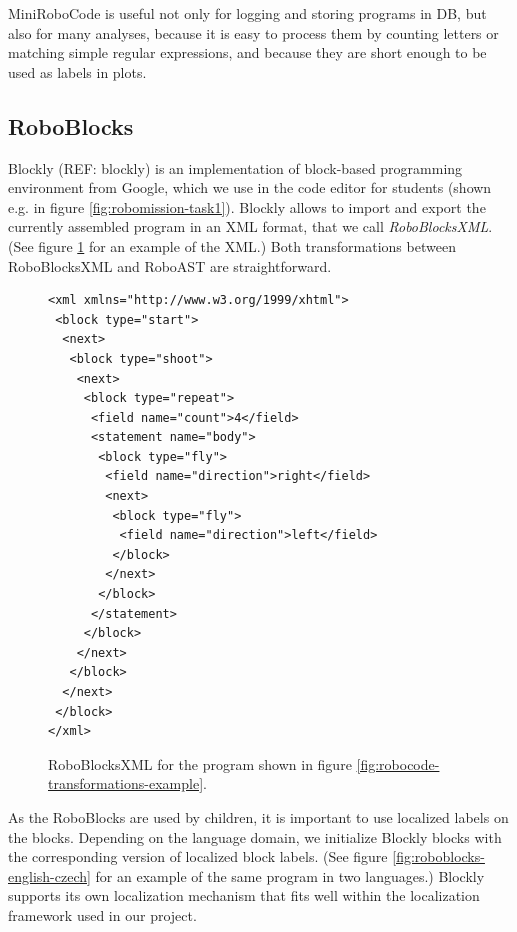 MiniRoboCode is useful not only for logging and storing programs in DB,
but also for many analyses,
because it is easy to process them by counting letters or matching simple regular expressions,
and because they are short enough to be used as labels in plots.


\subsection{RoboBlocks}

Blockly (REF: blockly) is an implementation of block-based programming
environment from Google,
which we use in the code editor for students
(shown e.g. in figure \ref{fig:robomission-task1}).
Blockly allows to import and export the currently assembled program in
an XML format, that we call \emph{RoboBlocksXML}.
(See figure \ref{fig:roboblocks-xml} for an example of the XML.)
Both transformations between RoboBlocksXML and RoboAST are straightforward.


\begin{figure}[h]
\begin{lstlisting}
<xml xmlns="http://www.w3.org/1999/xhtml">
 <block type="start">
  <next>
   <block type="shoot">
    <next>
     <block type="repeat">
      <field name="count">4</field>
      <statement name="body">
       <block type="fly">
        <field name="direction">right</field>
        <next>
         <block type="fly">
          <field name="direction">left</field>
         </block>
        </next>
       </block>
      </statement>
     </block>
    </next>
   </block>
  </next>
 </block>
</xml>
\end{lstlisting}
  \caption{%
    RoboBlocksXML for the program shown in figure %
    \ref{fig:robocode-transformations-example}.}
\label{fig:roboblocks-xml}
\end{figure}

As the RoboBlocks are used by children, it is important to use localized labels
on the blocks.
Depending on the language domain, we initialize Blockly blocks with the corresponding
version of localized block labels.
(See figure \ref{fig:roboblocks-english-czech} for an example of the same
program in two languages.)
Blockly supports its own localization mechanism that fits well
within the localization framework used in our project.

